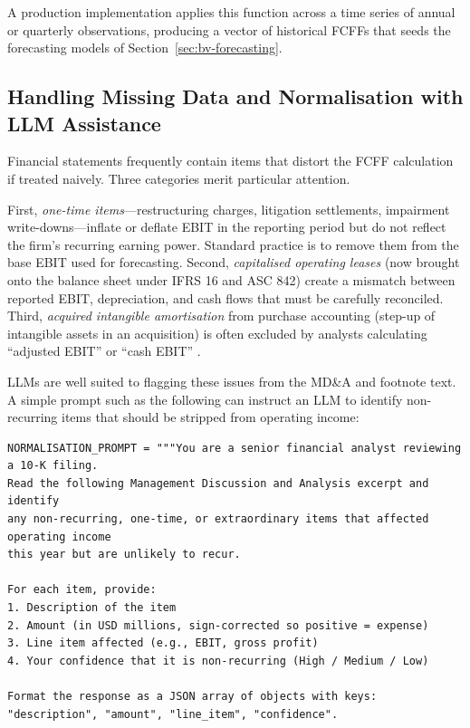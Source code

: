 \begin{deepdive}
A production implementation applies this function across a time series of annual or
quarterly observations, producing a vector of historical FCFFs that seeds the
forecasting models of Section~\ref{sec:bv-forecasting}.

\subsection{Handling Missing Data and Normalisation with LLM Assistance}
\label{subsec:bv-cashflows-missing}

Financial statements frequently contain items that distort the FCFF calculation if
treated naively. Three categories merit particular attention.

First, \emph{one-time items}---restructuring charges, litigation settlements,
impairment write-downs---inflate or deflate EBIT in the reporting period but do not
reflect the firm's recurring earning power. Standard practice is to remove them from
the base EBIT used for forecasting. Second, \emph{capitalised operating leases} (now
brought onto the balance sheet under IFRS 16 and ASC 842) create a mismatch between
reported EBIT, depreciation, and cash flows that must be carefully reconciled.
Third, \emph{acquired intangible amortisation} from purchase accounting (step-up of
intangible assets in an acquisition) is often excluded by analysts calculating
``adjusted EBIT'' or ``cash EBIT'' \cite{koller2020valuation}.

LLMs are well suited to flagging these issues from the MD\&A and footnote text.
A simple prompt such as the following can instruct an LLM to identify non-recurring
items that should be stripped from operating income:

\begin{listing}[H]
\begin{verbatim}
NORMALISATION_PROMPT = """You are a senior financial analyst reviewing a 10-K filing.
Read the following Management Discussion and Analysis excerpt and identify
any non-recurring, one-time, or extraordinary items that affected operating income
this year but are unlikely to recur.

For each item, provide:
1. Description of the item
2. Amount (in USD millions, sign-corrected so positive = expense)
3. Line item affected (e.g., EBIT, gross profit)
4. Your confidence that it is non-recurring (High / Medium / Low)

Format the response as a JSON array of objects with keys:
"description", "amount", "line_item", "confidence".


\end{verbatim}
\end{listing}
\end{deepdive}

